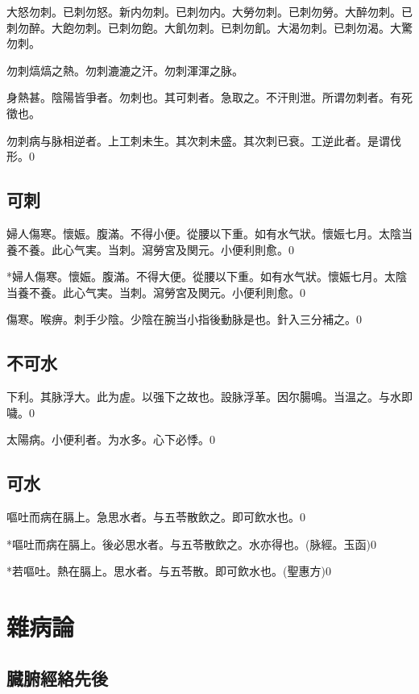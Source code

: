 \documentclass[12pt,twoside,UTF8,b5paper]{ctexbook}
\begin{document}
大怒勿刺。{已刺勿怒。}新内勿刺。{已刺勿内。}大勞勿刺。{已刺勿勞。}大醉勿刺。{已刺勿醉。}大飽勿刺。{已刺勿飽。大飢勿刺。已刺勿飢。}大渴勿刺。{已刺勿渴。}大驚勿刺。

勿刺熇熇之熱。勿刺漉漉之汗。勿刺渾渾之脉。

身熱甚。陰陽皆爭者。勿刺也。其可刺者。急取之。不汗則泄。所谓勿刺者。有死徵也。

勿刺病与脉相逆者。上工刺未生。其次刺未盛。其次刺已衰。工逆此者。是谓伐形。0

\chapter{可刺}

婦人傷寒。懷娠。腹滿。不得小便。從腰以下重。如有水气狀。懷娠七月。太陰当養不養。此心气実。当刺。瀉勞宮及関元。小便利則愈。0

*婦人傷寒。懷娠。腹滿。不得大便。從腰以下重。如有水气狀。懷娠七月。太陰当養不養。此心气実。当刺。瀉勞宮及関元。小便利則愈。0

傷寒。喉痹。刺手少陰。少陰在腕当小指後動脉是也。針入三分補之。0

\chapter{不可水}

下利。其脉浮大。此为虗。以强下之故也。設脉浮革。因尔腸鳴。当温之。与水即噦。0

太陽病。小便利者。为水多。心下必悸。0

\chapter{可水}

嘔吐而病在膈上。急思水者。与五苓散飲之。即可飲水也。0

*嘔吐而病在膈上。後必思水者。与五苓散飲之。水亦得也。(脉經。玉函)0

*若嘔吐。熱在膈上。思水者。与五苓散。即可飲水也。(聖惠方)0

\part{雜病論}

\chapter{臓腑經絡先後}
\end{document}

